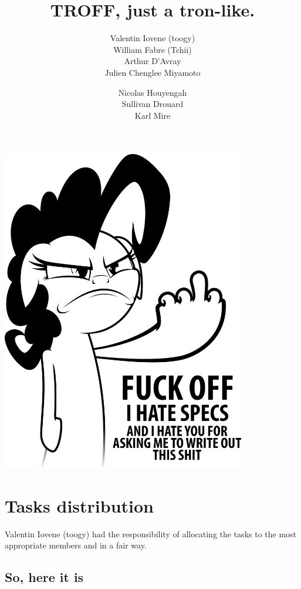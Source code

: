 \documentclass[pdftex,12pt,a4paper]{report}
\title{TROFF, just a tron-like.}
\author{Valentin Iovene (toogy)\\ William Fabre (Tchii)\\ Arthur D'Avray\\
Julien Chenglee Miyamoto \and Nicolas Houyengah\\ Sullivan Drouard\\ Karl Mire}
\begin{document}
\maketitle

\newpage

\begin{center}
\includegraphics[width=0.8\textwidth]{pony.jpg}
\end{center}

\newpage

\tableofcontents

\newpage

\section{Tasks distribution}

Valentin Iovene (toogy) had the responsibility of allocating the tasks
to the most appropriate members and in a fair way.

\subsection{So, here it is}
\end{document}

